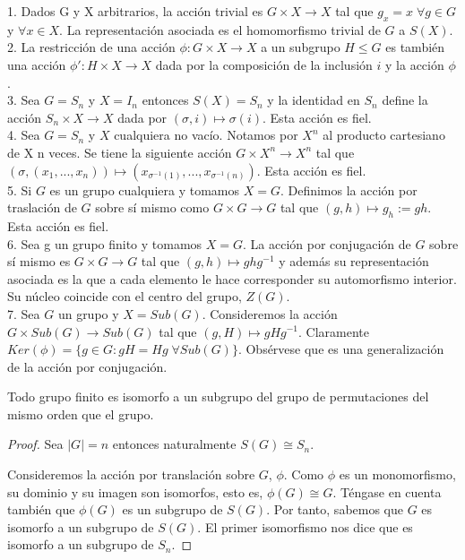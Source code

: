 \begin{example}
1. Dados G y X arbitrarios, la acción trivial es $G \times X \rightarrow X$ tal que $g_x = x \; \forall g \in G$ y $\forall x \in X$. La representación asociada es el homomorfismo trivial de $G$ a $S(X)$.\\
2. La restricción de una acción $\phi:G \times X \rightarrow X$ a un subgrupo $H \le G$ es también una acción $\phi':H \times X \rightarrow X$ dada por la composición de la inclusión $i$ y la acción $\phi$.\\
3. Sea $G = S_n$ y $X = I_n$ entonces $S(X) = S_n$ y la identidad en $S_n$ define la acción $S_n \times X \rightarrow X$ dada por $(\sigma,i) \mapsto \sigma(i)$. Esta acción es fiel.\\
4. Sea $G=S_n$ y $X$ cualquiera no vacío. Notamos por $X^n$ al producto cartesiano de X n veces. Se tiene la siguiente acción $G \times X^n \rightarrow X^n$ tal que $(\sigma,(x_1,...,x_n)) \mapsto (x_{\sigma^{-1}(1)},...,x_{\sigma^{-1}(n)})$. Esta acción es fiel.\\
5. Si $G$ es un grupo cualquiera y tomamos $X=G$. Definimos la acción por traslación de $G$ sobre sí mismo como $G \times G \rightarrow G$ tal que $(g,h) \mapsto g_h:=gh$. Esta acción es fiel.\\
6. Sea g un grupo finito y tomamos $X=G$. La acción por conjugación de $G$ sobre sí mismo es $G \times G \rightarrow G$ tal que $(g,h) \mapsto ghg^{-1}$ y además su representación asociada es la que a cada elemento le hace corresponder su automorfismo interior. Su núcleo coincide con el centro del grupo, $Z(G)$.\\
7. Sea $G$ un grupo y $X = Sub(G)$. Consideremos la acción $G \times Sub(G) \rightarrow Sub(G)$ tal que $(g,H) \mapsto gHg^{-1}$. Claramente $Ker(\phi) = \{g \in G:gH = Hg \; \forall Sub(G)\}$. Obsérvese que es una generalización de la acción por conjugación.
\end{example}

\begin{theorem}
Todo grupo finito es isomorfo a un subgrupo del grupo de permutaciones del mismo orden que el grupo.
\end{theorem}
\begin{proof}
Sea $|G|=n$ entonces naturalmente $S(G) \cong S_n$. 

Consideremos la acción por translación sobre $G$, $\phi$. Como $\phi$ es un monomorfismo, su dominio y su imagen son isomorfos, esto es, $\phi(G) \cong G$. Téngase en cuenta también que $\phi(G)$ es un subgrupo de $S(G)$. Por tanto, sabemos que $G$ es isomorfo a un subgrupo de $S(G)$. El primer isomorfismo nos dice que es isomorfo a un subgrupo de $S_n$.
\end{proof}

